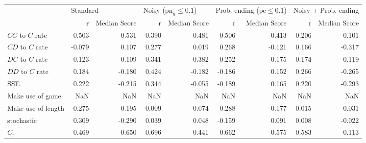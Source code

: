 \begin{tabular}{lrrrrrrrr}
\toprule
{} & \multicolumn{2}{l}{Standard} & \multicolumn{2}{l}{Noisy ($\mathrm{pn}_{n} \leq 0.1$)} & \multicolumn{2}{l}{Prob. ending ($\mathrm{pe} \leq 0.1$)} & \multicolumn{2}{l}{Noisy + Prob. ending} \\
{} &        r & Median Score &                                  r & Median Score &                                     r & Median Score &                    r & Median Score \\
\midrule
$CC$ to $C$ rate     &   -0.503 &        0.531 &                              0.390 &       -0.481 &                                 0.506 &       -0.413 &                0.206 &        0.101 \\
$CD$ to $C$ rate     &   -0.079 &        0.107 &                              0.277 &        0.019 &                                 0.268 &       -0.121 &                0.166 &       -0.317 \\
$DC$ to $C$ rate     &   -0.123 &        0.109 &                              0.341 &       -0.382 &                                -0.252 &        0.175 &                0.174 &        0.119 \\
$DD$ to $C$ rate     &    0.184 &       -0.180 &                              0.424 &       -0.182 &                                -0.186 &        0.152 &                0.266 &       -0.265 \\
SSE                  &    0.222 &       -0.215 &                              0.344 &       -0.055 &                                -0.189 &        0.165 &                0.220 &       -0.293 \\
Make use of game     &      NaN &          NaN &                                NaN &          NaN &                                   NaN &          NaN &                  NaN &          NaN \\
Make use of length   &   -0.275 &        0.195 &                             -0.009 &       -0.074 &                                 0.288 &       -0.177 &               -0.015 &        0.031 \\
stochastic           &    0.309 &       -0.290 &                              0.039 &        0.048 &                                -0.159 &        0.091 &                0.008 &       -0.022 \\
$C_r$                &   -0.469 &        0.650 &                              0.696 &       -0.441 &                                 0.662 &       -0.575 &                0.583 &       -0.113 \\

\end{tabular}
